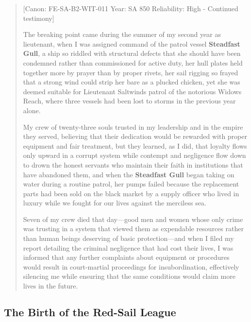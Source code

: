 \begin{quote}
{[}Canon: FE-SA-B2-WIT-011 \textbar{} Year: SA 850 \textbar{}
Reliability: High - Continued testimony{]}

The breaking point came during the summer of my second year as
lieutenant, when I was assigned command of the patrol vessel
\textbf{Steadfast Gull}, a ship so riddled with structural defects that
she should have been condemned rather than commissioned for active duty,
her hull plates held together more by prayer than by proper rivets, her
sail rigging so frayed that a strong wind could strip her bare as a
plucked chicken, yet she was deemed suitable for Lieutenant
Saltwind\textquotesingle s patrol of the notorious
Widow\textquotesingle s Reach, where three vessels had been lost to
storms in the previous year alone.

My crew of twenty-three souls trusted in my leadership and in the empire
they served, believing that their dedication would be rewarded with
proper equipment and fair treatment, but they learned, as I did, that
loyalty flows only upward in a corrupt system while contempt and
negligence flow down to drown the honest servants who maintain their
faith in institutions that have abandoned them, and when the
\textbf{Steadfast Gull} began taking on water during a routine patrol,
her pumps failed because the replacement parts had been sold on the
black market by a supply officer who lived in luxury while we fought for
our lives against the merciless sea.

Seven of my crew died that day---good men and women whose only crime was
trusting in a system that viewed them as expendable resources rather
than human beings deserving of basic protection---and when I filed my
report detailing the criminal negligence that had cost their lives, I
was informed that any further complaints about equipment or procedures
would result in court-martial proceedings for insubordination,
effectively silencing me while ensuring that the same conditions would
claim more lives in the future.
\end{quote}

\subsection{The Birth of the Red-Sail
League}\label{the-birth-of-the-red-sail-league}

